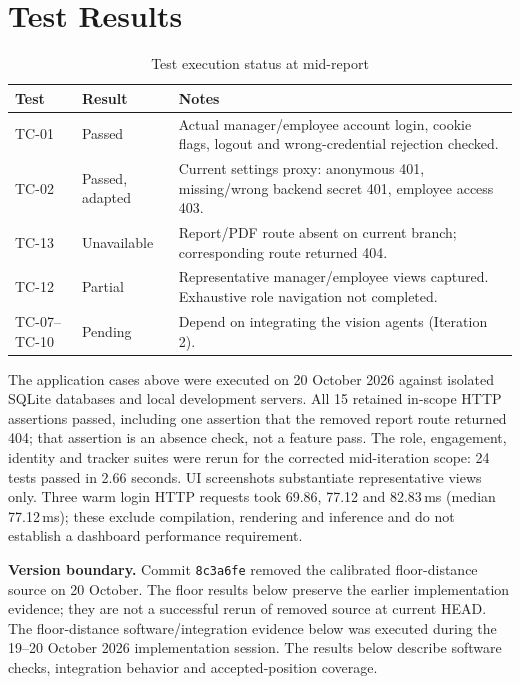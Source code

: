 \section{Test Results}
\begin{table}[H]
\centering
\caption{Test execution status at mid-report}
\begin{tabular}{P{0.12\textwidth}P{0.18\textwidth}P{0.5\textwidth}}
\toprule
Test & Result & Notes\\
\midrule
TC-01 & Passed & Actual manager/employee account login, cookie flags, logout and wrong-credential rejection checked.\\
TC-02 & Passed, adapted & Current settings proxy: anonymous 401, missing/wrong backend secret 401, employee access 403.\\
TC-13 & Unavailable & Report/PDF route absent on current branch; corresponding route returned 404.\\
TC-12 & Partial & Representative manager/employee views captured. Exhaustive role navigation not completed.\\
TC-07--TC-10 & Pending & Depend on integrating the vision agents (Iteration 2).\\
\bottomrule
\end{tabular}
\end{table}
The application cases above were executed on 20 October 2026 against isolated SQLite databases and local development servers. All 15 retained in-scope HTTP assertions passed, including one assertion that the removed report route returned 404; that assertion is an absence check, not a feature pass. The role, engagement, identity and tracker suites were rerun for the corrected mid-iteration scope: 24 tests passed in 2.66 seconds. UI screenshots substantiate representative views only. Three warm login HTTP requests took 69.86, 77.12 and 82.83\,ms (median 77.12\,ms); these exclude compilation, rendering and inference and do not establish a dashboard performance requirement.

\textbf{Version boundary.} Commit \texttt{8c3a6fe} removed the calibrated floor-distance source on 20 October. The floor results below preserve the earlier implementation evidence; they are not a successful rerun of removed source at current HEAD. The floor-distance software/integration evidence below was executed during the 19--20 October 2026 implementation session. The results below describe software checks, integration behavior and accepted-position coverage.

